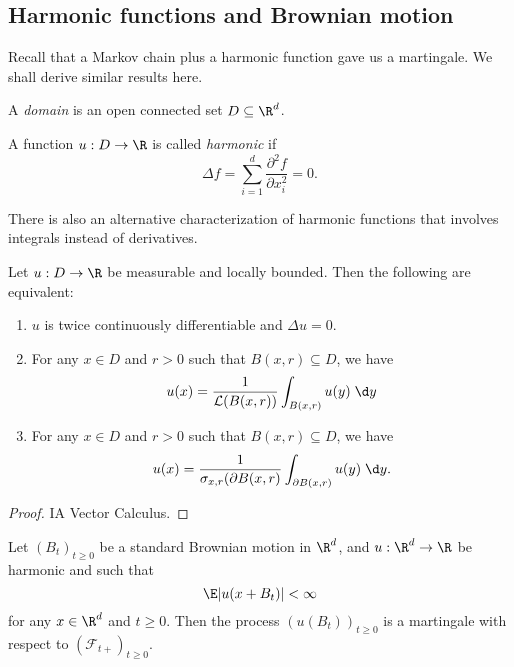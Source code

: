 \documentclass[a4paper]{article}
\begin{document}
\subsection{Harmonic functions and Brownian motion}
Recall that a Markov chain plus a harmonic function gave us a martingale. We shall derive similar results here.

\begin{defi}[Domain]
  A \emph{domain} is an open connected set $D \subseteq \R^d$.
\end{defi}

\begin{defi}
  A function $u: D \to \R$ is called \emph{harmonic} if\index{$\Delta$}
  \[
    \Delta f = \sum_{i = 1}^d \frac{\partial^2 f}{\partial x_i^2} = 0.
  \]
\end{defi}

There is also an alternative characterization of harmonic functions that involves integrals instead of derivatives.
\begin{lemma}
  Let $u: D \to \R$ be measurable and locally bounded. Then the following are equivalent:
  \begin{enumerate}
    \item $u$ is twice continuously differentiable and $\Delta u = 0$.
    \item For any $x \in D$ and $r > 0$ such that $B(x, r) \subseteq D$, we have
      \[
        u(x) = \frac{1}{\mathcal{L}(B(x, r))} \int_{B(x, r)} u(y) \;\d y
      \]
    \item For any $x \in D$ and $r > 0$ such that $B(x, r) \subseteq D$, we have
      \[
        u(x) = \frac{1}{\sigma_{x, r}(\partial B(x, r)} \int_{\partial B(x, r)} u(y) \;\d y.
      \]
  \end{enumerate}
\end{lemma}

\begin{proof}
  IA Vector Calculus.
\end{proof}

\begin{thm}
  Let $(B_t)_{t \geq 0}$ be a standard Brownian motion in $\R^d$, and $u: \R^d \to \R$ be harmonic and such that
  \[
    \E |u(x + B_t)| < \infty
  \]
  for any $x \in \R^d$ and $t \geq 0$. Then the process $(u(B_t))_{t \geq 0}$ is a martingale with respect to $(\mathcal{F}_{t+})_{t \geq 0}$.
\end{thm}

\printindex
\end{document}
